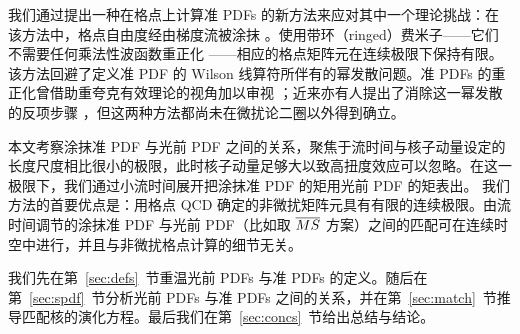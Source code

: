 我们通过提出一种在格点上计算准 PDFs 的新方法来应对其中一个理论挑战：在该方法中，格点自由度经由梯度流被涂抹
\cite{Narayanan:2006rf,Luscher:2011bx,Luscher:2013cpa}。使用带环（ringed）费米子——它们不需要任何乘法性波函数重正化
\cite{Makino:2014taa,Hieda:2016lly}——相应的格点矩阵元在连续极限下保持有限。该方法回避了定义准 PDF 的 Wilson 线算符所伴有的幂发散问题。准 PDFs 的重正化曾借助重夸克有效理论的视角加以审视 \cite{Ji:2015jwa}；近来亦有人提出了消除这一幂发散的反项步骤
\cite{Chen:2016fxx,Ishikawa:2016znu}，但这两种方法都尚未在微扰论二圈以外得到确立。


本文考察涂抹准
PDF 与光前 PDF 之间的关系，聚焦于流时间与核子动量设定的长度尺度相比很小的极限，此时核子动量足够大以致高扭度效应可以忽略。在这一极限下，我们通过小流时间展开把涂抹准 PDF 的矩用光前 PDF 的矩表出。
我们方法的首要优点是：用格点 QCD 确定的非微扰矩阵元具有有限的连续极限。由流时间调节的涂抹准 PDF 与光前 PDF（比如取 $\overline{MS}$
方案）之间的匹配可在连续时空中进行，并且与非微扰格点计算的细节无关。

我们先在第~\ref{sec:defs}~节重温光前 PDFs 与准 PDFs 的定义。随后在第~\ref{sec:spdf}~节分析光前 PDFs 与准 PDFs 之间的关系，并在第~\ref{sec:match}~节推导匹配核的演化方程。最后我们在第~\ref{sec:concs}~节给出总结与结论。


